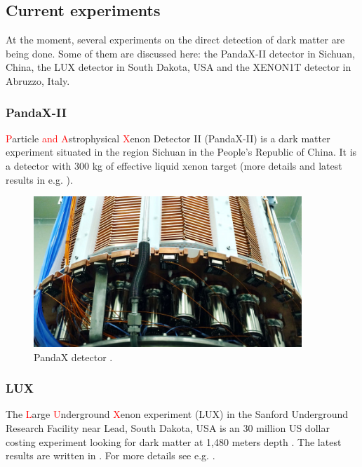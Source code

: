 \documentclass{article}
\begin{document}

\subsection{Current experiments}
\label{sec:current_exp}
At the moment, several experiments on the direct detection of dark matter are being done. Some of them are discussed here: the PandaX-II detector in Sichuan, China, the LUX detector in South Dakota, USA and the XENON1T detector in Abruzzo, Italy.

\subsubsection{PandaX-II}
\textcolor{red}{P}article \textcolor{red}{and A}strophysical \textcolor{red}{X}enon Detector II (PandaX-II) is a dark matter experiment situated in the region Sichuan in the People's Republic of China. It is a detector with 300 kg of effective liquid xenon target \cite{Liu2015} (more details and latest results in e.g. \cite{Cui:2017nnn}).\\

\begin{figure}[h]
    \centering
    \includegraphics[width=0.9\textwidth]{pandax.jpg}
    \caption{PandaX detector \cite{SJTU}.}
    \label{fig:PandaX}
\end{figure}

\subsubsection{LUX}
The \textcolor{red}{L}arge \textcolor{red}{U}nderground \textcolor{red}{X}enon experiment (LUX) in the Sanford Underground Research Facility near Lead, South Dakota, USA is an 30 million US dollar costing experiment looking for dark matter at 1,480 meters depth \cite{Reich2013}. The latest results are written in \cite{Akerib:2016vxi}. For more details see e.g. \cite{Akerib:2012ys}.
\end{document}
